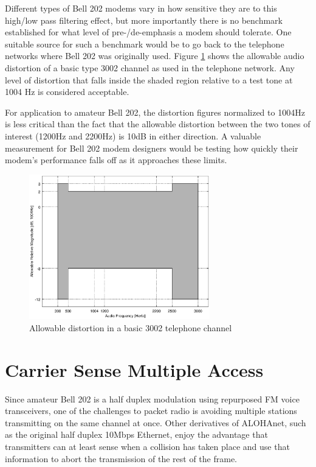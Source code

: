 \documentclass[12pt,letterpaper]{article}
\begin{document}
Different types of Bell 202 modems vary in how sensitive they are to this high/low
pass filtering effect, but more importantly there is no benchmark established
for what level of pre-/de-emphasis a modem should tolerate.
One suitable source for such a benchmark would be to go back to the
telephone networks where Bell 202 was originally used.
Figure \ref{fig:3002} shows the allowable audio distortion of a basic type 3002
channel as used in the telephone network. Any level of distortion that falls 
inside the shaded region relative to a test tone at 1004 Hz is considered acceptable.

For application to amateur Bell 202, the distortion figures normalized to 1004Hz is 
less critical than the fact that the allowable distortion between the two
tones of interest (1200Hz and 2200Hz) is 10dB in either direction.
A valuable measurement for Bell 202 modem designers would be testing how
quickly their modem's performance falls off as it approaches these limits.

\begin{figure}
	\centering
	\includegraphics[width=0.7\textwidth]{src/octave/3002}
	\caption{Allowable distortion in a basic 3002 telephone channel}
	\label{fig:3002}
\end{figure}


\section{Carrier Sense Multiple Access}
\label{sec:bell202csma}

Since amateur Bell 202 is a half duplex modulation using repurposed 
FM voice transceivers, 
one of the challenges to packet radio is avoiding multiple stations
transmitting on the same channel at once. 
Other derivatives of ALOHAnet, 
such as the original half duplex 10Mbps Ethernet, 
enjoy the advantage that transmitters can
at least sense when a collision has taken place 
and use that information to abort the transmission of the rest of the frame.
\end{document}
